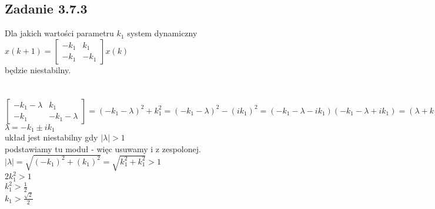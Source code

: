 \pagebreak
\subsection*{Zadanie 3.7.3} {\color{darkgray}
	Dla jakich wartości parametru $k_1$ system dynamiczny\\
	$x(k+1)=\left[ \begin{array}{cc}    -k_1 &k_1 \\ -k_1 &-k_1    \end{array}\right]x(k)$\\
	będzie niestabilny.\\
}\lineh
\\\\
$\left[ \begin{array}{cc}    -k_1 -\lambda&k_1 \\ -k_1 &-k_1-\lambda    \end{array}\right]
=(-k_1-\lambda)^2+k_1^2=(-k_1-\lambda)^2-(ik_1)^2=(-k_1-\lambda-ik_1)(-k_1-\lambda+ik_1)=(\lambda+k_1-ik_1)(\lambda+k_1+ik_1)=0$\\
$\lambda=-k_1 \pm ik_1$\\
układ jest niestabilny gdy $|\lambda|>1$\\
podstawiamy tu moduł - więc usuwamy i z zespolonej.\\
$|\lambda|=\sqrt{(-k_1)^2+(k_1)^2}=\sqrt{k_1^2+k_1^2}>1$\\
$2k_1^2>1$\\
$k_1^2>\frac{1}{2}$\\
$k_1>\frac{\sqrt{2}}{2}$\\













\pagebreak
